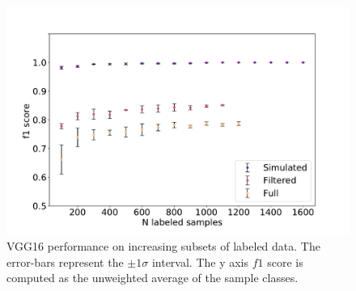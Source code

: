 \begin{figure}
\includegraphics[width=\textwidth]{plots/vgg_n_samples.pdf}
\caption[VGG16 performance on labeled subsets]{VGG16 performance on increasing subsets of labeled data. The error-bars represent the $\pm 1\sigma$ interval. The y axis $f1$ score is computed as the unweighted average of the sample classes.}\label{fig:vgg_n_samples}
\end{figure}